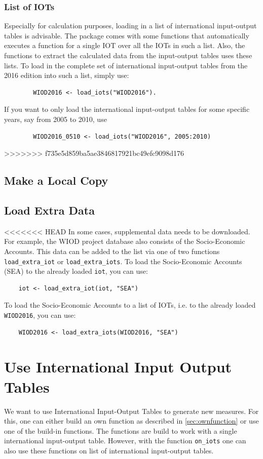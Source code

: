 \documentclass[10pt,a4paper]{paper}
\begin{document}
\begin{itemize}
	\subsubsection{List of IOTs}
	Especially for calculation purposes, loading in a list of international input-output tables is advisable. The package comes with some functions that automatically executes a function for a single IOT over all the IOTs in such a list. Also, the functions to extract the calculated data from the input-output tables uses these lists. To load in the complete set of international input-output tables from the 2016 edition into such a list, simply use:
	\begin{verbatim}
		WIOD2016 <- load_iots("WIOD2016").
	\end{verbatim}
	If you want to only load the international input-output tables for some specific years, say from 2005 to 2010, use
	\begin{verbatim}
		WIOD2016_0510 <- load_iots("WIOD2016", 2005:2010)
	\end{verbatim}
>>>>>>> f735e5d859ba5ae3846817921bc49efc9098d176
	
	\subsection{Make a Local Copy}
	
	\subsection{Load Extra Data}
<<<<<<< HEAD
	In some cases, supplemental data needs to be downloaded. For example, the WIOD project database also consists of the Socio-Economic Accounts. This data can be added to the list via one of two functions \texttt{load\_extra\_iot} or \texttt{load\_extra\_iots}. To load the Socio-Economic Accounts (SEA) to the already loaded \texttt{iot}, you can use:
	\begin{Verbatim}
	iot <- load_extra_iot(iot, "SEA")
	\end{Verbatim} 
	To load the Socio-Economic Accounts to a list of IOTs, i.e. to the already loaded \texttt{WIOD2016}, you can use:
	\begin{Verbatim}
	WIOD2016 <- load_extra_iots(WIOD2016, "SEA")
	\end{Verbatim}
	
	
	\section{Use International Input Output Tables}
	We want to use International Input-Output Tables to generate new measures. For this, one can either build an own function as described in \ref{sec:ownfunction} or use one of the build-in functions. The functions are build to work with a single international input-output table. However, with the function \texttt{on\_iots} one can also use these functions on list of international input-output tables.
	

\end{itemize}
\end{document}
